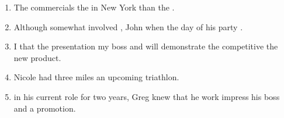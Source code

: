 \begin{enumerate}
\item \begin{inparaenum}[A]
The commercials  the  in New York  than the . 
\end{inparaenum}

\item \begin{inparaenum}[A]
Although  somewhat involved , John  when the day of his party .
\end{inparaenum}

\item \begin{inparaenum}[A]
I  that the presentation  my boss and  will demonstrate the competitive  the new product. 
\end{inparaenum}

\item \begin{inparaenum}[A]
Nicole had  three miles    an upcoming triathlon. 
\end{inparaenum}

\item \begin{inparaenum}[A]
 in his current role for two years, Greg knew that he  work  impress his boss and  a promotion. 
\end{inparaenum}


\end{enumerate}
